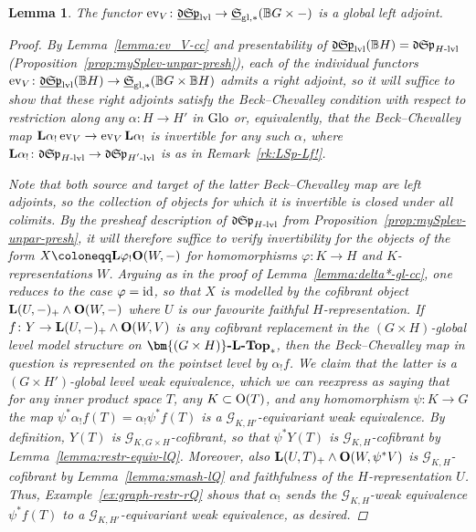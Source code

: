 \documentclass[reqno]{memo-l}
\theoremstyle{mythm}
\newtheorem{lemma}[thm]{Lemma}
\theoremstyle{definition}
\numberwithin{equation}{section}
\newcommand{\gl}{\textup{gl}}
\DeclareMathOperator{\ev}{ev}
\renewcommand{\phi}{\varphi}
\newcommand{\cat}[1]{\textbf{\textup{#1}}}
\renewcommand{\O}{{\textup{O}}}
\newcommand{\id}{\textup{id}}
\newcommand{\Glo}{\textup{Glo}}
\newcommand{\BGcat}[1]{\mathbb B{#1}}
\newcommand{\ulhelper}[2]{\underline{\setbox0=\hbox{$#1#2$}\dp0=0.4pt \box0\relax}}
\newcommand{\ul}[1]{{\mathpalette\ulhelper{#1}}\hbox{\rule[-2pt]{0pt}{0pt}}}
\let\smashp=\wedge
\newcommand{\mySp}{{\mathfrak S\kern-.5pt\mathfrak p}}
\newcommand{\myLSp}{{\mathfrak d\kern-.25pt}\mySp}
\newcommand{\ulmySplev}{\ul{\myLSp}_\textup{lvl}}
\newcommand{\myS}{{{\mathfrak S\kern-.4pt}}}
\begin{document}
\begin{lemma}\label{lemma:ev-V-param-la}
    The functor $\ev_V\colon\ulmySplev\to\ul\myS_{\gl,*}(\BGcat{G}\times-)$ is a global left adjoint.
    \begin{proof}
        By Lemma~\ref{lemma:ev_V-cc} and presentability of $\ulmySplev(\BGcat{H})=\myLSp_\text{$H$-lvl}$ (Proposition~\ref{prop:mySplev-unpar-presh}), each of the individual functors $\ev_V\colon\ulmySplev(\BGcat{H})\to\ul\myS_{\gl,*}(\BGcat{G}\times\BGcat{H})$ admits a right adjoint, so it will suffice to show that these right adjoints satisfy the Beck--Chevalley condition with respect to restriction along any $\alpha\colon H\to H'$ in $\Glo$ or, equivalently, that the Beck--Chevalley map $\cat{L}\alpha_!\ev_V\to\ev_V\cat{L}\alpha_!$ is invertible for any such $\alpha$, where $\cat{L}\alpha_!\colon\myLSp_\text{$H$-lvl}\to\myLSp_\text{$H'$-lvl}$ is as in Remark~\ref{rk:LSp-Lf!}.
        
        Note that both source and target of the latter Beck--Chevalley map are left adjoints, so the collection of objects for which it is invertible is closed under all colimits. By the presheaf description of $\myLSp_\text{$H$-lvl}$ from Proposition~\ref{prop:mySplev-unpar-presh}, it will therefore suffice to verify invertibility for the objects of the form $X\coloneqq\cat{L}\phi_!\cat{O}(W,-)$ for homomorphisms $\phi\colon K\to H$ and $K$-representations $W$. Arguing as in the proof of Lemma~\ref{lemma:delta*-gl-cc}, one reduces to the case $\phi=\id$, so that $X$ is modelled by the cofibrant object $\cat{L}(U,-)_+\smashp\cat{O}(W,-)$ where $U$ is our favourite faithful $H$-representation. If $f\colon Y\to \cat{L}(U,-)_+\smashp\cat{O}(W,V)$ is any cofibrant replacement in the $(G\times H)$-global level model structure on $\cat{$\bm{(G\times H)}$-$\cat{L}$-Top}_*$, then the Beck--Chevalley map in question is represented on the pointset level by $\alpha_!f$. We claim that the latter is a $(G\times H')$-global level weak equivalence, which we can reexpress as saying that for any inner product space $T$, any $K\subset\O(T)$, and any homomorphism $\psi\colon K\to G$ the map $\psi^*\alpha_!f(T)=\alpha_!\psi^*f(T)$ is a $\mathcal G_{K,H'}$-equivariant weak equivalence.
        By definition, $Y(T)$ is $\mathcal G_{K,G\times H}$-cofibrant, so that $\psi^*Y(T)$ is $\mathcal G_{K,H}$-cofibrant by Lemma~\ref{lemma:restr-equiv-lQ}. Moreover, also $\cat{L}(U,T)_+\smashp\cat{O}(W,\psi^*V)$ is $\mathcal G_{K,H}$-cofibrant by Lemma~\ref{lemma:smash-lQ} and faithfulness of the $H$-representation $U$. Thus, Example~\ref{ex:graph-restr-rQ} shows that $\alpha_!$ sends the $\mathcal G_{K,H}$-weak equivalence $\psi^*f(T)$ to a $\mathcal G_{K,H'}$-equivariant weak equivalence, as desired.
    \end{proof}
\end{lemma}
\end{document}
